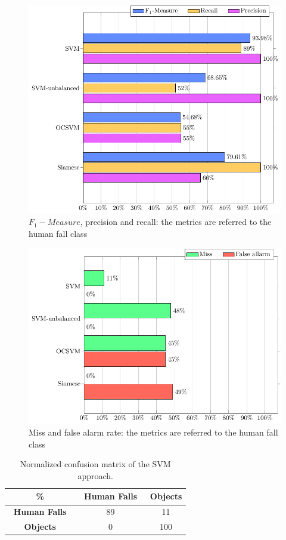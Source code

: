 	\begin{figure}
	\includegraphics[width=\linewidth]{img/prai/results_f1/results_f1}
	\caption{$ F_1 -Measure$, precision and recall: the metrics are referred to the human fall class}
	\label{fig:results_f1}
\end{figure}
\begin{figure}
	\includegraphics[width=\linewidth]{img/prai/results_fn_fp/results_fn_fp}
	\caption{Miss and false alarm rate: the metrics are referred to the human fall class}
	\label{fig:results_fn_fp}
\end{figure}
\begin{table}[ht]
	\caption{Normalized confusion matrix of the SVM approach.}
	\label{tab:cm_svm}
	\begin{center}
		
		\begin{tabular}[ht]{c|c|c}	
			\hline
			\textbf{\%} & \textbf{$\,$ Human Falls $\,$ } & \textbf{Objects} \\ %
			
			\hline
			\textbf{$\,$ Human Falls $\,$ }     			& 89    &   11     \\
			\textbf{Objects} 								& 0    &   100     	\\
			\hline
		\end{tabular}
	\end{center}
\end{table}
